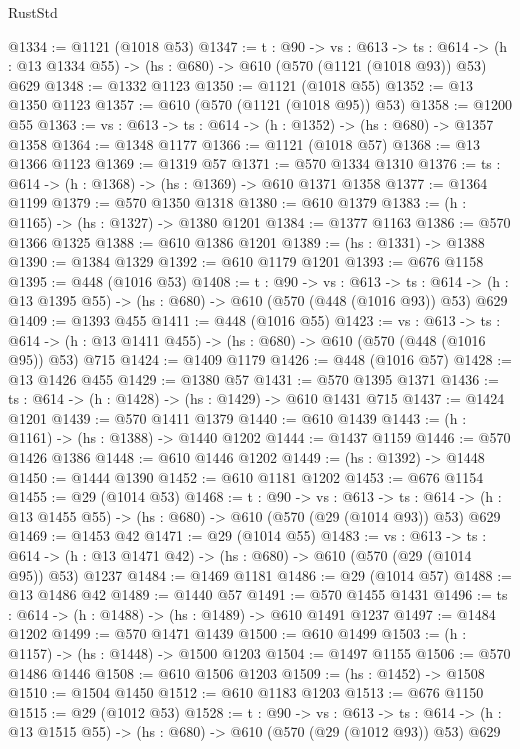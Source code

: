 \begin{lexlean}{RustStd}
\begin{coremodule}
@1334 := @1121 (@1018 @53)
@1347 := {t : @90} ->
  {vs : @613} ->
  {ts : @614} -> (h : @13 @1334 @55) -> (hs : @680) -> @610 (@570 (@1121 (@1018 @93)) @53) @629
@1348 := @1332 @1123
@1350 := @1121 (@1018 @55)
@1352 := @13 @1350 @1123
@1357 := @610 (@570 (@1121 (@1018 @95)) @53)
@1358 := @1200 @55
@1363 := {vs : @613} -> {ts : @614} -> (h : @1352) -> (hs : @680) -> @1357 @1358
@1364 := @1348 @1177
@1366 := @1121 (@1018 @57)
@1368 := @13 @1366 @1123
@1369 := @1319 @57
@1371 := @570 @1334 @1310
@1376 := {ts : @614} -> (h : @1368) -> (hs : @1369) -> @610 @1371 @1358
@1377 := @1364 @1199
@1379 := @570 @1350 @1318
@1380 := @610 @1379
@1383 := (h : @1165) -> (hs : @1327) -> @1380 @1201
@1384 := @1377 @1163
@1386 := @570 @1366 @1325
@1388 := @610 @1386 @1201
@1389 := (hs : @1331) -> @1388
@1390 := @1384 @1329
@1392 := @610 @1179 @1201
@1393 := @676 @1158
@1395 := @448 (@1016 @53)
@1408 := {t : @90} ->
  {vs : @613} ->
  {ts : @614} -> (h : @13 @1395 @55) -> (hs : @680) -> @610 (@570 (@448 (@1016 @93)) @53) @629
@1409 := @1393 @455
@1411 := @448 (@1016 @55)
@1423 := {vs : @613} ->
  {ts : @614} -> (h : @13 @1411 @455) -> (hs : @680) -> @610 (@570 (@448 (@1016 @95)) @53) @715
@1424 := @1409 @1179
@1426 := @448 (@1016 @57)
@1428 := @13 @1426 @455
@1429 := @1380 @57
@1431 := @570 @1395 @1371
@1436 := {ts : @614} -> (h : @1428) -> (hs : @1429) -> @610 @1431 @715
@1437 := @1424 @1201
@1439 := @570 @1411 @1379
@1440 := @610 @1439
@1443 := (h : @1161) -> (hs : @1388) -> @1440 @1202
@1444 := @1437 @1159
@1446 := @570 @1426 @1386
@1448 := @610 @1446 @1202
@1449 := (hs : @1392) -> @1448
@1450 := @1444 @1390
@1452 := @610 @1181 @1202
@1453 := @676 @1154
@1455 := @29 (@1014 @53)
@1468 := {t : @90} ->
  {vs : @613} ->
  {ts : @614} -> (h : @13 @1455 @55) -> (hs : @680) -> @610 (@570 (@29 (@1014 @93)) @53) @629
@1469 := @1453 @42
@1471 := @29 (@1014 @55)
@1483 := {vs : @613} ->
  {ts : @614} -> (h : @13 @1471 @42) -> (hs : @680) -> @610 (@570 (@29 (@1014 @95)) @53) @1237
@1484 := @1469 @1181
@1486 := @29 (@1014 @57)
@1488 := @13 @1486 @42
@1489 := @1440 @57
@1491 := @570 @1455 @1431
@1496 := {ts : @614} -> (h : @1488) -> (hs : @1489) -> @610 @1491 @1237
@1497 := @1484 @1202
@1499 := @570 @1471 @1439
@1500 := @610 @1499
@1503 := (h : @1157) -> (hs : @1448) -> @1500 @1203
@1504 := @1497 @1155
@1506 := @570 @1486 @1446
@1508 := @610 @1506 @1203
@1509 := (hs : @1452) -> @1508
@1510 := @1504 @1450
@1512 := @610 @1183 @1203
@1513 := @676 @1150
@1515 := @29 (@1012 @53)
@1528 := {t : @90} ->
  {vs : @613} ->
  {ts : @614} -> (h : @13 @1515 @55) -> (hs : @680) -> @610 (@570 (@29 (@1012 @93)) @53) @629

\end{coremodule}
\end{lexlean}
